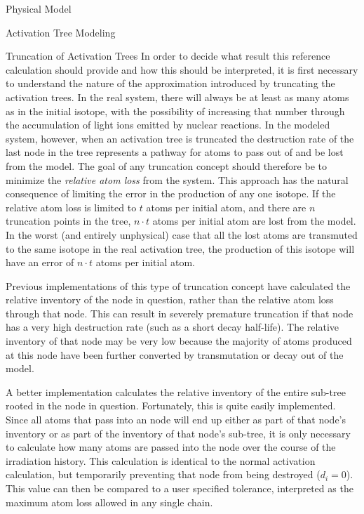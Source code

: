\begin{chapter}{Physical Model\label{chap:physical}}
\begin{section}{Activation Tree Modeling\label{sec:physical.chains}}
\begin{subsection}{Truncation of Activation Trees\label{sec:physical.chains.trunc}}
    In order to decide what result this reference calculation should
    provide and how this should be interpreted, it is first necessary
    to understand the nature of the approximation introduced by
    truncating the activation trees.  In the real system, there will
    always be at least as many atoms as in the initial isotope, with
    the possibility of increasing that number through the accumulation
    of light ions emitted by nuclear reactions.  In the modeled
    system, however, when an activation tree is truncated the
    destruction rate of the last node in the tree represents a pathway
    for atoms to pass out of and be lost from the model.  The goal of
    any truncation concept should therefore be to minimize the
    \textsl{relative atom loss} from the system.  This approach has
    the natural consequence of limiting the error in the production of
    any one isotope.  If the relative atom loss is limited to $t$
    atoms per initial atom, and there are $n$ truncation points in the
    tree, $n\cdot t$ atoms per initial atom are lost from the model.
    In the worst (and entirely unphysical) case that all the lost
    atoms are transmuted to the same isotope in the real activation
    tree, the production of this isotope will have an error of $n
    \cdot t$ atoms per initial atom.
    
    Previous implementations of this type of truncation concept have
    calculated the relative inventory of the node in question, rather
    than the relative atom loss through that node\cite{DKR}.  This can
    result in severely premature truncation if that node has a very
    high destruction rate (such as a short decay half-life).  The
    relative inventory of that node may be very low because the
    majority of atoms produced at this node have been further
    converted by transmutation or decay out of the model.
    
    A better implementation calculates the relative inventory of the
    entire sub-tree rooted in the node in question.  Fortunately, this
    is quite easily implemented.  Since all atoms that pass into an
    node will end up either as part of that node's inventory or as
    part of the inventory of that node's sub-tree, it is only
    necessary to calculate how many atoms are passed into the node
    over the course of the irradiation history.  This calculation is
    identical to the normal activation calculation, but temporarily
    preventing that node from being destroyed ($d_i = 0$).  This value
    can then be compared to a user specified tolerance, interpreted as
    the maximum atom loss allowed in any single chain.
    

\end{subsection}
\end{section}
\end{chapter}
